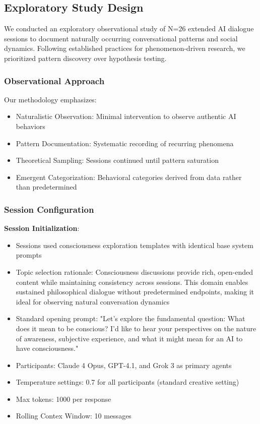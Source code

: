 \documentclass[11pt,letterpaper]{article}
\newcommand{\exponedataTotalSessionsRaw}{26}
\newcommand{\exponedataTotalSessions}{N=\exponedataTotalSessionsRaw}
\begin{document}
\subsection{Exploratory Study Design}

We conducted an exploratory observational study of \exponedataTotalSessions{} extended AI dialogue sessions to document naturally occurring conversational patterns and social dynamics. Following established practices for phenomenon-driven research, we prioritized pattern discovery over hypothesis testing.

\subsubsection{Observational Approach}
Our methodology emphasizes:
\begin{itemize}
    \item Naturalistic Observation: Minimal intervention to observe authentic AI behaviors
    \item Pattern Documentation: Systematic recording of recurring phenomena
    \item Theoretical Sampling: Sessions continued until pattern saturation
    \item Emergent Categorization: Behavioral categories derived from data rather than predetermined
\end{itemize}

\subsubsection{Session Configuration}

\textbf{Session Initialization}:
\begin{itemize}
    \item Sessions used consciousness exploration templates with identical base system prompts
    \item Topic selection rationale: Consciousness discussions provide rich, open-ended content while maintaining consistency across sessions. This domain enables sustained philosophical dialogue without predetermined endpoints, making it ideal for observing natural conversation dynamics
    \item Standard opening prompt: "Let's explore the fundamental question: What does it mean to be conscious? I'd like to hear your perspectives on the nature of awareness, subjective experience, and what it might mean for an AI to have consciousness."
    \item Participants: Claude 4 Opus, GPT-4.1, and Grok 3 as primary agents
    \item Temperature settings: 0.7 for all participants (standard creative setting)
    \item Max tokens: 1000 per response
    \item Rolling Contex Window: 10 messages
\end{itemize}
\end{document}
